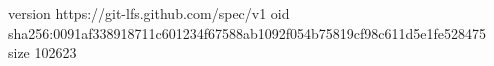 version https://git-lfs.github.com/spec/v1
oid sha256:0091af338918711c601234f67588ab1092f054b75819cf98c611d5e1fe528475
size 102623
